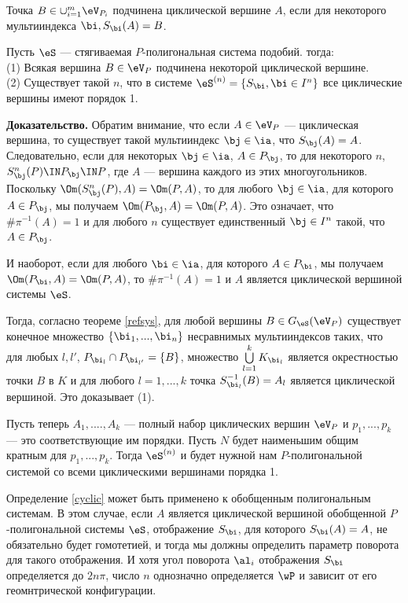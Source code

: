 \begin{definition}
Точка $B \in\cup_{i=1}^m  \eV_{P_i}$ подчинена циклической вершине  $A$, если для некоторого мультииндекса $\bi, S_{\bi}(A)=B$.
\end{definition}

\begin{prop}\label{1ordcyc}
Пусть $\eS$ --- стягиваемая $P$-полигональная система подобий. тогда:\\
(1) Всякая вершина $B\in \eV_P$ подчинена некоторой циклической вершине.\\
(2) Существует такой $n$, что в системе $\eS^{(n)}=\{S_\bi, \bi\in I^n\}$ все циклические вершины имеют порядок 1.
\end{prop}

{\bf Доказательство.} 
Обратим внимание, что если $A\in \eV_P$ --- циклическая вершина, то существует такой мультииндекс $\bj\in\ia$, что $S_\bj(A)=A$. 
Следовательно, если для некоторых $\bj\in\ia$, $ A\in P_\bj$, то для некоторого $n$, $S_\bj^n(P)\IN P_\bj \IN P$, где $A$ --- вершина каждого из этих многоугольников. 
Поскольку $\Om(S_\bj^n(P),A)=\Om(P,A)$, то для любого $\bj\in\ia$, для которого $A\in P_\bj$, мы получаем $\Om(P_\bj,A)=\Om(P,A)$. 
Это означает, что $\#\pi^{-1}(A)=1$ и для любого $n$ существует единственный $\bj\in I^n$ такой, что $A\in P_\bj$. 

И наоборот, если для любого $\bi\in\ia$, для которого $A\in P_\bi$, мы получаем $\Om(P_\bi,A)=\Om(P,A)$, то $\#\pi^{-1}(A)=1$ и $A$ является циклической вершиной системы $\eS$.

Тогда, согласно теореме \ref{refsys}, для любой вершины $B\in G_\eS(\eV_P)$ существует конечное множество $\{\bi_1,...,\bi_n\}$ несравнимых мультииндексов таких, что для любых $l,l'$, $P_{\bi_l}\cap P_{\bi_{l'}}=\{B\}$, множество $\bigcup\limits_{l=1}^k K_{\bi_l}$ является окрестностью точки $B$ в $K$ и для любого $l=1,...,k$ точка $S_{\bi_l}^{-1}(B)=A_l$ является циклической вершиной. Это доказывает (1).

Пусть теперь $A_1,....,A_k$ --- полный набор циклических вершин $\eV_P$ и $p_1,...,p_k$ --- это соответствующие им порядки. Пусть $N$ будет наименьшим общим кратным для $p_1,...,p_k$. Тогда $\eS^{(n)}$ и будет нужной нам $P$-полигональной системой со всеми циклическими вершинами порядка 1.\vse

Определение \ref{cyclic} может быть применено к обобщенным полигональным системам. В этом случае, если $A$ является циклической вершиной обобщенной $P$-полигональной системы $\eS$, отображение $S_\bi$, для которого $S_\bi(A)=A$, не обязательно будет гомотетией, и тогда мы должны определить параметр поворота для такого отображения. И хотя угол поворота $\al_i$ отображения $S_\bi$ определяется до $2n\pi$,  число $n$ однозначно определяется $\wP$ и зависит от его геомнтрической конфигурации.

